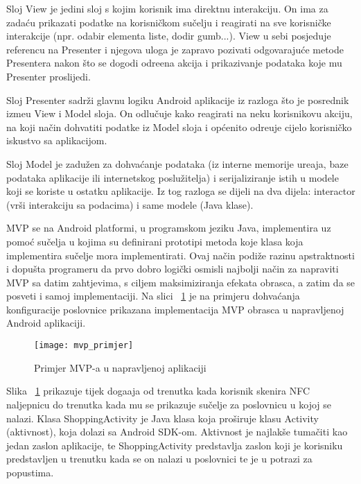 Sloj View je jedini sloj s kojim korisnik ima direktnu interakciju. On ima za zada\'{c}u prikazati podatke na korisni\v{c}kom su\v{c}elju i reagirati na sve korisni\v{c}ke interakcije (npr. odabir elementa liste, dodir gumb...). View u sebi posjeduje referencu na Presenter i njegova uloga je zapravo pozivati odgovaraju\'{c}e metode Presentera nakon \v{s}to se dogodi odre\dj ena akcija i prikazivanje podataka koje mu Presenter proslijedi.

Sloj Presenter sadr\v{z}i glavnu logiku Android aplikacije iz razloga \v{s}to je posrednik izme\dj u View i Model sloja. On odlu\v{c}uje kako reagirati na neku korisnikovu akciju, na koji na\v{c}in dohvatiti podatke iz Model sloja i op\'{c}enito odre\dj uje cijelo korisni\v{c}ko iskustvo sa aplikacijom.

Sloj Model je zadu\v{z}en za dohva\'{c}anje podataka (iz interne memorije ure\dj aja, baze podataka aplikacije ili internetskog poslu\v{z}itelja) i serijaliziranje istih u modele koji se koriste u ostatku aplikacije. Iz tog razloga se dijeli na dva dijela: interactor (vr\v{s}i interakciju sa podacima) i same modele (Java klase).

MVP se na Android platformi, u programskom jeziku Java, implementira uz pomo\'{c} su\v{c}elja u kojima su definirani prototipi metoda koje klasa koja implementira su\v{c}elje mora implementirati. Ovaj na\v{c}in podi\v{z}e razinu apstraktnosti i dopu\v{s}ta programeru da prvo dobro logi\v{c}ki osmisli najbolji na\v{c}in za napraviti MVP sa datim zahtjevima, s ciljem maksimiziranja efekata obrasca, a zatim da se posveti i samoj implementaciji. Na slici ~\ref{fig:mvp} je na primjeru dohva\'{c}anja konfiguracije poslovnice prikazana implementacija MVP obrasca u napravljenoj Android aplikaciji.


\begin{figure}[!htbp]
	\begin{center}
 \texttt{[image: mvp\_primjer]}
 \caption{Primjer MVP-a u napravljenoj aplikaciji}
 \label{fig:mvp}
	\end{center}
\end{figure}

Slika ~\ref{fig:mvp} prikazuje tijek doga\dj aja od trenutka kada korisnik skenira NFC naljepnicu do trenutka kada mu se prikazuje su\v{c}elje za poslovnicu u kojoj se nalazi. Klasa ShoppingActivity je Java klasa koja pro\v{s}iruje klasu Activity (aktivnost), koja dolazi sa Android SDK-om. Aktivnost je najlak\v{s}e tuma\v{c}iti kao jedan zaslon aplikacije, te ShoppingActivity predstavlja zaslon koji je korisniku predstavljen u trenutku kada se on nalazi u poslovnici te je u potrazi za popustima.

